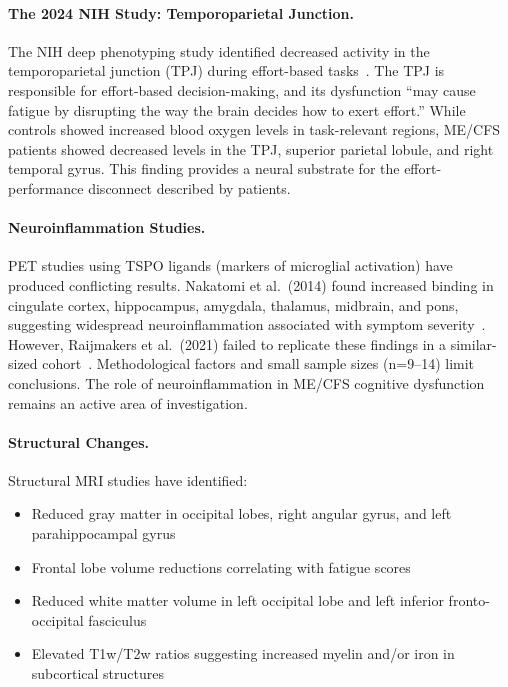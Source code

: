 \paragraph{The 2024 NIH Study: Temporoparietal Junction.}
The NIH deep phenotyping study identified decreased activity in the temporoparietal junction (TPJ) during effort-based tasks~\cite{walitt2024deep}. The TPJ is responsible for effort-based decision-making, and its dysfunction ``may cause fatigue by disrupting the way the brain decides how to exert effort.'' While controls showed increased blood oxygen levels in task-relevant regions, ME/CFS patients showed decreased levels in the TPJ, superior parietal lobule, and right temporal gyrus. This finding provides a neural substrate for the effort-performance disconnect described by patients.

\paragraph{Neuroinflammation Studies.}
PET studies using TSPO ligands (markers of microglial activation) have produced conflicting results. Nakatomi et al.\ (2014) found increased binding in cingulate cortex, hippocampus, amygdala, thalamus, midbrain, and pons, suggesting widespread neuroinflammation associated with symptom severity~\cite{Nakatomi2014neuroinflammation}. However, Raijmakers et al.\ (2021) failed to replicate these findings in a similar-sized cohort~\cite{Raijmakers2021neuroinflammation}. Methodological factors and small sample sizes (n=9--14) limit conclusions. The role of neuroinflammation in ME/CFS cognitive dysfunction remains an active area of investigation.

\paragraph{Structural Changes.}
Structural MRI studies have identified:
\begin{itemize}
    \item Reduced gray matter in occipital lobes, right angular gyrus, and left parahippocampal gyrus
    \item Frontal lobe volume reductions correlating with fatigue scores~\cite{Shan2020neuroimaging}
    \item Reduced white matter volume in left occipital lobe and left inferior fronto-occipital fasciculus
    \item Elevated T1w/T2w ratios suggesting increased myelin and/or iron in subcortical structures
\end{itemize}

